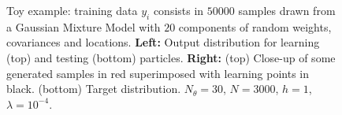\begin{figure}
\begin{centering}
\begin{tabular}{ccc|c}
\end{tabular}
\par\end{centering}
\caption{Toy example: training data $y_i$ consists in $50 000$ samples drawn from a Gaussian Mixture Model with $20$ components of random weights, covariances and locations. \textbf{Left:} Output distribution for learning (top) and testing (bottom) particles. \textbf{Right:} (top) Close-up of some generated samples in red superimposed with learning points in black. (bottom) Target distribution. $N_\theta=30$, $N=3000$, $h=1$, $\lambda=10^{-4}$.\label{fig:toy_example}}
\end{figure}



